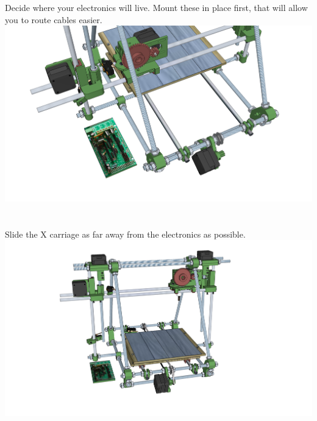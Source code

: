 \documentclass[twoside,a4paper,titlepage]{memoir}
\begin{document}
	\section{}
	Decide where your electronics will live. Mount these in place first, that will allow you to route cables
	easier.\\
	\includegraphics[width=1\linewidth]{graphics/ch10_10.png}
	
	\section{}
	Slide the X carriage as far away from the electronics as possible.\\
	\includegraphics[width=1\linewidth]{graphics/ch10_11.png}
	
\end{document}

